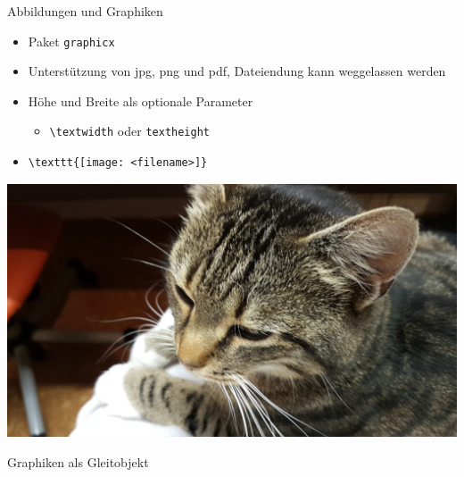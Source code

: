 \documentclass[presentation,aspectratio=169]{beamer}
\begin{document}
\begin{frame}[fragile]{Abbildungen und Graphiken}
  \begin{itemize}
    \item Paket \verb|graphicx|
    \item Unterstützung von jpg, png und pdf, Dateiendung kann weggelassen werden
    \item Höhe und Breite als optionale Parameter
      \begin{itemize}
        \item \verb|\textwidth| oder \verb|textheight|
      \end{itemize}
    \item
      \begin{verbatim}
\texttt{[image: <filename>]}
      \end{verbatim}
  \end{itemize}
  \begin{center}
    \includegraphics[height=.5\textheight]{katze}
  \end{center}
\end{frame}

\begin{frame}{Graphiken als Gleitobjekt}
  \begin{minipage}[c]{.4\textwidth}
    
  \end{minipage}
  \hfill
  \begin{minipage}[c]{.5\textwidth}
    \inputminted{latex}{codebeispiele/graphics-figure.tex}
  \end{minipage}
\end{frame}
\end{document}
